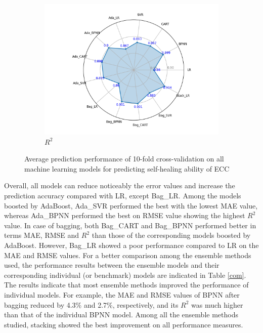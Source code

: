 \documentclass[11pt]{article}
\begin{document}
\begin{figure}[!h]
\begin{subfigure}{.53\textwidth}
			\includegraphics[width = \linewidth]{R2circle.png}
			\caption{$R^2$}
		\end{subfigure}%
		\hspace{1em}
		\caption{Average prediction performance of 10-fold cross-validation on all machine learning models for predicting self-healing ability of ECC }\label{comp}
	\end{figure}
	

	Overall, all models can  reduce noticeably the error values and increase the prediction accuracy compared with LR, except Bag\_LR. Among the models boosted by AdaBoost, Ada\_SVR performed the best with the lowest MAE value, whereas Ada\_BPNN performed the best on RMSE value showing the highest $R^2$ value. In case of bagging, both Bag\_CART and Bag\_BPNN performed better in terms MAE, RMSE and $R^2$ than those of the corresponding models boosted by AdaBoost. However, Bag\_LR showed a poor performance compared to LR on the MAE and RMSE values. For a better comparison among the ensemble methods used, the performance results between the ensemble models and their corresponding individual (or benchmark) models are indicated in Table \ref{com}. The results indicate that most ensemble methods improved the performance of individual models. For example, the MAE and RMSE values of BPNN after bagging reduced by 4.3\% and 2.7\%, respectively, and its $R^2$ was much higher than that of the individual BPNN model. Among all the ensemble methods studied, stacking showed the best improvement on all performance measures.
	
\end{document}
